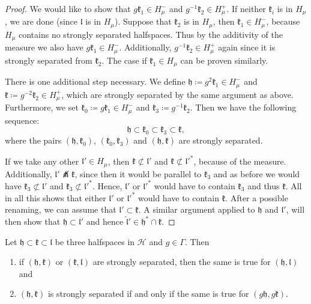 \begin{proof}
  We would like to show that \(g\mathfrak{k}_1 \in H_\mu^-\) and \(g^{-1}\mathfrak{k}_2 \in H_\mu^+\). If neither \(\mathfrak{k}_i\) is in \(H_\mu\), we are done (since \(\mathfrak{l}\) is in \(H_\mu\)). Suppose that \(\mathfrak{k}_2\) is in \(H_\mu\), then \(\mathfrak{k}_1 \in H_\mu^-\), because \(H_\mu\) contains no strongly separated halfspaces. Thus by the additivity of the measure we also have \(g\mathfrak{k}_1 \in H_\mu^-\). Additionally, \(g^{-1}\mathfrak{k}_2 \in H_\mu^+\) again since it is strongly separated from \(\mathfrak{k}_2\). The case if \(\mathfrak{k}_1 \in H_\mu\) can be proven similarly.

  There is one additional step necessary. We define \(\mathfrak{h} \coloneqq g^2\mathfrak{k}_1 \in H_\mu^-\) and \(\mathfrak{k} \coloneqq g^{-2}\mathfrak{k}_2 \in H_\mu^+\), which are strongly separated by the same argument as above. Furthermore, we set \(\mathfrak{k_0} \coloneqq g\mathfrak{k}_1 \in H_\mu^-\) and \(\mathfrak{k}_3 \coloneqq g^{-1}\mathfrak{k}_2\). Then we have the following sequence:
  \[
    \mathfrak{h} \subset \mathfrak{k}_0 \subset \mathfrak{k}_3 \subset \mathfrak{k},
  \]
  where the pairs \((\mathfrak{h}, \mathfrak{k}_0)\), \((\mathfrak{k_0}, \mathfrak{k}_3)\) and \((\mathfrak{h}, \mathfrak{k})\) are strongly separated. 

  If we take any other \(\mathfrak{l}' \in H_\mu\), then \(\mathfrak{k} \not\subset \mathfrak{l}'\) and \(\mathfrak{k} \not \subset \mathfrak{l}'^\ast\), because of the measure. Additionally, \(\mathfrak{l}' \not\pitchfork \mathfrak{k}\), since then it would be parallel to \(\mathfrak{k}_3\) and as before we would have \(\mathfrak{k}_3 \not\subset \mathfrak{l}'\) and \(\mathfrak{k}_3 \not\subset \mathfrak{l}'^\ast\). Hence, \(\mathfrak{l}'\) or \(\mathfrak{l}'^\ast\) would have to contain \(\mathfrak{k}_3\) and thus \(\mathfrak{k}\). All in all this shows that either \(\mathfrak{l}'\) or \(\mathfrak{l}'^\ast\) would have to contain \(\mathfrak{k}\). After a possible renaming, we can assume that \(\mathfrak{l}' \subset \mathfrak{k}\). A similar argument applied to \(\mathfrak{h}\) and \(\mathfrak{l}'\), will then show that \(\mathfrak{h} \subset \mathfrak{l}'\) and hence \(\mathfrak{\hat l}' \in \mathfrak{h}^\ast \cap \mathfrak{k}\).
\end{proof}

\begin{lemma}
  Let \(\mathfrak{h} \subset \mathfrak{k} \subset \mathfrak{l}\) be three halfspaces in \(\mathcal{H}\) and \(g \in \Gamma\). Then
  \begin{enumerate}
  \item if \((\mathfrak{h}, \mathfrak{k})\) or \((\mathfrak{k}, \mathfrak{l})\) are strongly separated, then the same is true for \((\mathfrak{h}, \mathfrak{l})\) and
  \item \((\mathfrak{h}, \mathfrak{k})\) is strongly separated if and only if the same is true for \((g\mathfrak{h}, g\mathfrak{k})\).
  \end{enumerate}
\end{lemma}

